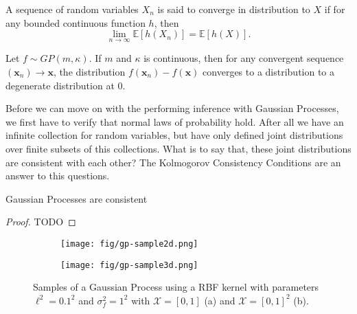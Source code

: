 \begin{definition}
    A sequence of random variables $X_n$ is said to converge in distribution to $X$
    if for any bounded continuous function $h$, then
    \begin{equation*}
        \lim_{n\to \infty} \mathbb{E}[h(X_n)] = \mathbb{E}[h(X)].
    \end{equation*}
\end{definition}

\begin{theorem}
    Let $f \sim GP(m, \kappa)$.
    If $m$ and $\kappa$ is continuous, then for any convergent sequence $(\mathbf{x}_n) \to \mathbf{x}$,
    the distribution $f(\mathbf{x}_n) - f(\mathbf{x})$ converges to a distribution to a degenerate distribution at 0.
\end{theorem}


Before we can move on with the performing inference with Gaussian Processes, we first have to verify that normal laws of probability hold.
After all we have an infinite collection for random variables, but have only defined joint distributions over finite subsets of this collections.
What is to say that, these joint distributions are consistent with each other?
The Kolmogorov Consistency Conditions are an answer to this questions.

\begin{theorem}
    
\end{theorem}

\begin{theorem}
    Gaussian Processes are consistent
\end{theorem}
\begin{proof}
    TODO
\end{proof}


\begin{figure}
     \centering
     \begin{subfigure}[b]{0.45\textwidth}
         \centering
         \texttt{[image: fig/gp-sample2d.png]}
         \caption{}
         \label{subfig:2d-gp-sample}
     \end{subfigure}
     \hfill
     \begin{subfigure}[b]{0.45\textwidth}
         \centering
         \texttt{[image: fig/gp-sample3d.png]}
         \caption{}
         \label{subfig:3d-gp-sample}
     \end{subfigure}
     \hfill
    \caption{Samples of a Gaussian Process using a RBF kernel with parameters $\ell^{2} = 0.1^2$ and $\sigma^{2}_f = 1 ^ 2$ with
        $\mathcal{X} = [0, 1]$ (a) and $\mathcal{X} = [0, 1]^2$ (b).
    }
    \label{fig:gp-sample}
\end{figure}

